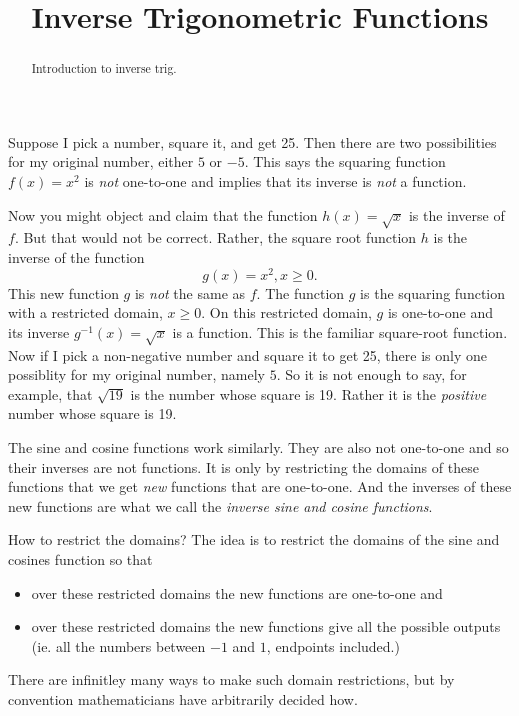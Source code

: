 \documentclass{ximera}
\title{Inverse Trigonometric Functions}
\begin{document}
\begin{abstract}
Introduction to inverse trig.
\end{abstract}
\maketitle

Suppose I pick a number, square it, and get 25. Then there are two possibilities for my original number, either $5$ or $-5$. This says the squaring function $f(x)=x^2$ is \emph{not} one-to-one and implies that its inverse is \emph{not} a function. 

Now you might object and claim that the function $h(x)=\sqrt{x}$ is the inverse of $f$. But that would not be correct. Rather, the square root function $h$ is the inverse of the  function
\[
    g(x) = x^2 , x\geq 0 .
\]
This new function $g$ is \emph{not} the same as $f$. The function $g$ is the squaring function with a restricted domain, $x\geq 0$. On this restricted domain, $g$ is one-to-one and its inverse $g^{-1}(x) = \sqrt{x}$ is a function. This is the familiar square-root function. Now if I pick a non-negative number and square it to get 25, there is only one possiblity for my original number, namely $5$. So it is not enough to say, for example, that $\sqrt{19}$ is the number whose square is 19. Rather it is the \emph{positive} number whose square is 19.

The sine and cosine functions work similarly. They are also not one-to-one and so their inverses are not functions. It is only by restricting the domains of these functions that we get \emph{new} functions that are one-to-one. And the inverses of these new functions are what we call the \emph{inverse sine and cosine functions}.

How to restrict the domains? The idea is to restrict the domains of the sine and cosines function so that 
\begin{itemize}

\item{over these restricted domains the new functions are one-to-one and}

\item{over these restricted domains the new functions give all the possible outputs (ie. all the numbers between $-1$ and $1$, endpoints included.)}

\end{itemize}

There are infinitley many ways to make such domain restrictions, but by convention mathematicians have arbitrarily decided how.
\end{document}
